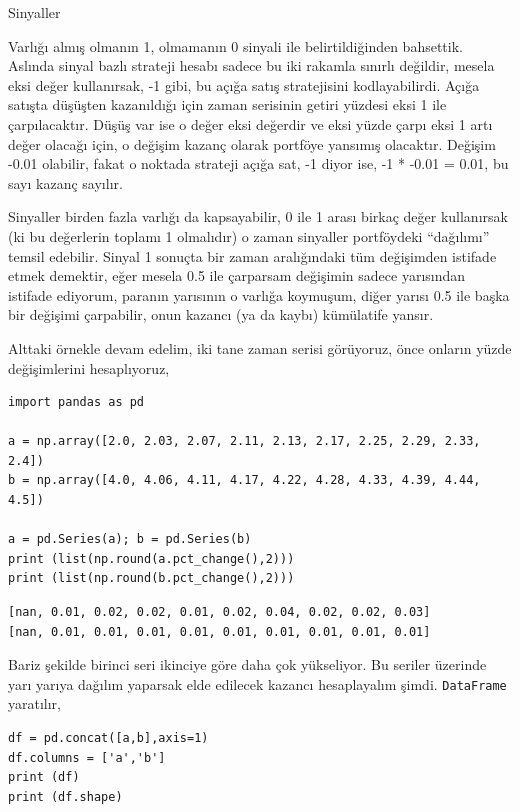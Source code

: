 \documentclass[12pt,fleqn]{article}\usepackage{../../common}
\begin{document}
Sinyaller

Varlığı almış olmanın 1, olmamanın 0 sinyali ile belirtildiğinden
bahsettik. Aslında sinyal bazlı strateji hesabı sadece bu iki rakamla sınırlı
değildir, mesela eksi değer kullanırsak, -1 gibi, bu açığa satış stratejisini
kodlayabilirdi. Açığa satışta düşüşten kazanıldığı için zaman serisinin getiri
yüzdesi eksi 1 ile çarpılacaktır. Düşüş var ise o değer eksi değerdir ve eksi
yüzde çarpı eksi 1 artı değer olacağı için, o değişim kazanç olarak portföye
yansımış olacaktır. Değişim -0.01 olabilir, fakat o noktada strateji açığa sat,
-1 diyor ise, -1 * -0.01 = 0.01, bu sayı kazanç sayılır.

Sinyaller birden fazla varlığı da kapsayabilir, 0 ile 1 arası birkaç değer
kullanırsak (ki bu değerlerin toplamı 1 olmalıdır) o zaman sinyaller portföydeki
``dağılımı'' temsil edebilir. Sinyal 1 sonuçta bir zaman aralığındaki tüm
değişimden istifade etmek demektir, eğer mesela 0.5 ile çarparsam değişimin
sadece yarısından istifade ediyorum, paranın yarısının o varlığa koymuşum, diğer
yarısı 0.5 ile başka bir değişimi çarpabilir, onun kazancı (ya da kaybı)
kümülatife yansır.

Alttaki örnekle devam edelim, iki tane zaman serisi görüyoruz, önce onların
yüzde değişimlerini hesaplıyoruz,

\begin{verbatim}
import pandas as pd

a = np.array([2.0, 2.03, 2.07, 2.11, 2.13, 2.17, 2.25, 2.29, 2.33, 2.4])
b = np.array([4.0, 4.06, 4.11, 4.17, 4.22, 4.28, 4.33, 4.39, 4.44, 4.5])

a = pd.Series(a); b = pd.Series(b)
print (list(np.round(a.pct_change(),2)))
print (list(np.round(b.pct_change(),2)))
\end{verbatim}

\begin{verbatim}
[nan, 0.01, 0.02, 0.02, 0.01, 0.02, 0.04, 0.02, 0.02, 0.03]
[nan, 0.01, 0.01, 0.01, 0.01, 0.01, 0.01, 0.01, 0.01, 0.01]
\end{verbatim}

Bariz şekilde birinci seri ikinciye göre daha çok yükseliyor. Bu seriler
üzerinde yarı yarıya dağılım yaparsak elde edilecek kazancı hesaplayalım
şimdi. \verb!DataFrame! yaratılır,

\begin{verbatim}
df = pd.concat([a,b],axis=1)
df.columns = ['a','b']
print (df)
print (df.shape)
\end{verbatim}
\end{document}
